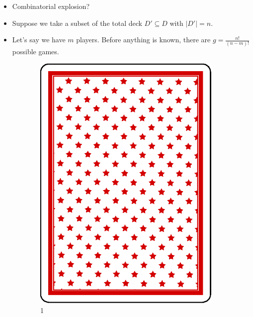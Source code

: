 \documentclass[10pt]{beamer}
\begin{document}
\begin{frame}
\begin{columns}
  \begin{column}{7cm}
    \begin{itemize}[label=$\clubsuit$]
      \item Combinatorial explosion?
      \item Suppose we take a subset of the total deck $D' \subseteq D$ with $|D'| = n$. \item Let's say we have $m$ players. Before anything is known, there are $\displaystyle g=\frac{n!}{(n-m)!}$ possible games.
    \end{itemize}
    \begin{figure}
     \begin{subfigure}{.15\linewidth}
      \includegraphics[width=\linewidth]{im/back.eps}
      \caption{1}
     \end{subfigure}
     \begin{subfigure}{.15\linewidth}

\end{subfigure}
\end{figure}
\end{column}
\end{columns}
\end{frame}
\end{document}
